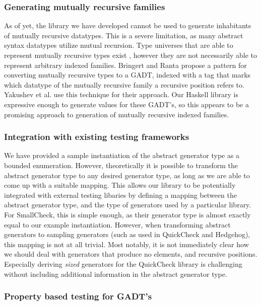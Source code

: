 \documentclass[a4paper,msc,twosized=semi]{uustthesis}
\let\oldemph\emph
\renewcommand\emph[1]{{\large\oldemph{#1}}}
\begin{document}
\subsubsection{Generating mutually recursive families}

  As of yet, the library we have developed cannot be used to generate inhabitants of 
  mutually recursive datatypes. This is a severe limitation, as many abstract syntax 
  datatypes utilize mutual recursion. Type universes that are able to represent 
  mutually recursive types exist \cite{miraldo2018sums}\cite{yakushev2009generic}, however 
  they are not necessarily able to represent arbitrary indexed families. Bringert and 
  Ranta \cite{bringert2006pattern} propose a pattern for converting mutually recursive 
  types to a GADT, indexed with a tag that marks which datatype of the mutually 
  recursive family a recursive position refers to. Yakushev et al. \cite
  {yakushev2009generic} use this technique for their approach. Our Haskell library is 
  expressive enough to generate values for these GADT's, so this appears to be a 
  promising approach to generation of mutually recursive indexed families. 

\subsubsection{Integration with existing testing frameworks}

  We have provided a sample instantiation of the abstract generator type as a bounded 
  enumeration. However, theoretically it is possible to transform the abstract 
  generator type to any desired generator type, as long as we are able to come up with 
  a suitable mapping. This allows our library to be potentially integrated with 
  external testing libaries by defining a mapping between the abstract generator type, 
  and the type of generators used by a particular library. For SmallCheck, this is 
  simple enough, as their generator type is almost exactly equal to our example 
  instantiation. However, when transforming abstract generators to sampling generators 
  (such as used in QuickCheck and Hedgehog), this mapping is not at all trivial. Most 
  notably, it is not immediately clear how we should deal with generators that produce 
  no elements, and recursive positions. Especially deriving \emph{sized} generators 
  for the QuickCheck library is challenging without including additional information 
  in the abstract generator type. 

\subsubsection{Property based testing for GADT's}
\end{document}
